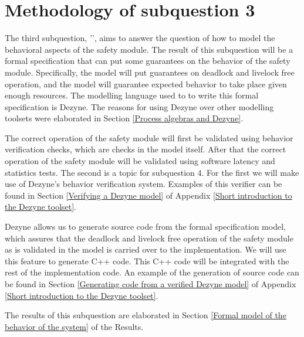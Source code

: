 \documentclass[12pt]{scrreprt}
\begin{document}
\section{Methodology of subquestion 3}
\label{Methodology of subquestion 3}
The third subquestion, '\sqthree', aims to answer the question of how to model the behavioral aspects of the safety module. The result of this subquestion will be a formal specification that can put some guarantees on the behavior of the safety module. Specifically, the model will put guarantees on deadlock and livelock free operation, and the model will guarantee expected behavior to take place given enough resources. The modelling language used to to write this formal specification is Dezyne. The reasons for using Dezyne over other modelling toolsets were elaborated in Section \ref{Process algebras and Dezyne}.
\par
The correct operation of the safety module will first be validated using behavior verification checks, which are checks in the model itself. After that the correct operation of the safety module will be validated using software latency and statistics tests. The second is a topic for subquestion 4. For the first we will make use of Dezyne's behavior verification system. Examples of this verifier can be found in Section \ref{Verifying a Dezyne model} of Appendix \ref{Short introduction to the Dezyne toolset}.
\par
Dezyne allows us to generate source code from the formal specification model, which assures that the deadlock and livelock free operation of the safety module as is validated in the model is carried over to the implementation. We will use this feature to generate C++ code. This C++ code will be integrated with the rest of the implementation code. An example of the generation of source code can be found in Section \ref{Generating code from a verified Dezyne model} of Appendix \ref{Short introduction to the Dezyne toolset}.
\par
The results of this subquestion are elaborated in Section \ref{Formal model of the behavior of the system} of the Results.
\end{document}

